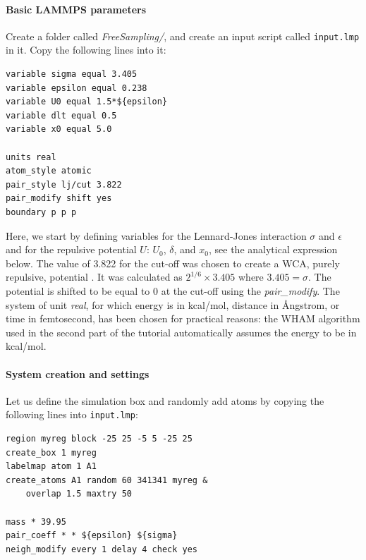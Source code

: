 \documentclass[9pt,tutorial]{livecoms}
\newcommand{\flecmd}[1]{\textcolor{command}{\texttt{#1}}} %
\begin{document}
\paragraph{Basic LAMMPS parameters}
\noindent Create a folder called \textit{FreeSampling/}, and create an input
script called \flecmd{input.lmp} in it. Copy the following lines into it:
\begin{lstlisting}
variable sigma equal 3.405
variable epsilon equal 0.238
variable U0 equal 1.5*${epsilon}
variable dlt equal 0.5
variable x0 equal 5.0

units real
atom_style atomic
pair_style lj/cut 3.822
pair_modify shift yes
boundary p p p
\end{lstlisting}
Here, we start by defining variables for the Lennard-Jones interaction
$\sigma$ and $\epsilon$ and for the repulsive potential $U$: $U_0$, $\delta$, and $x_0$,
see the analytical expression below. The value of 3.822 for the cut-off was chosen to
create a WCA, purely repulsive, potential \cite{weeks1971role}. It was calculated
as $2^{1/6} \times 3.405$ where $3.405 = \sigma$. The potential is shifted to be
equal to 0 at the cut-off using the \textit{pair\_modify}. The system of unit
\textit{real}, for which energy is in kcal/mol, distance in Ångstrom, or time in
femtosecond, has been chosen for practical reasons: the WHAM algorithm used in
the second part of the tutorial automatically assumes the energy to be in kcal/mol.

\paragraph{System creation and settings}
\noindent Let us define the simulation box and randomly add atoms by copying the
following lines into \flecmd{input.lmp}:
\begin{lstlisting}
region myreg block -25 25 -5 5 -25 25
create_box 1 myreg
labelmap atom 1 A1
create_atoms A1 random 60 341341 myreg &
    overlap 1.5 maxtry 50

mass * 39.95
pair_coeff * * ${epsilon} ${sigma}
neigh_modify every 1 delay 4 check yes
\end{lstlisting}
\end{document}
